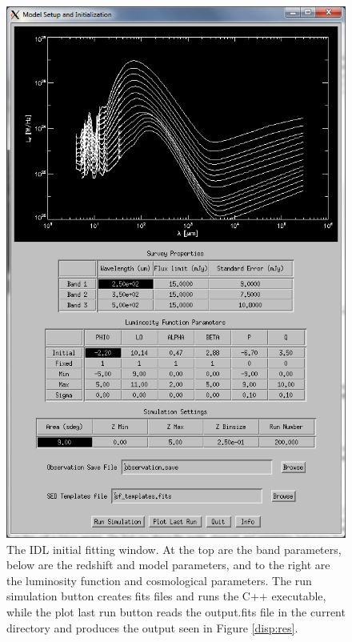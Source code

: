 \documentclass[twocolumn,letterpaper,10pt]{article}
\begin{document}
\begin{figure}
  \centering
  \includegraphics[width=5 in]{initial.png}
  \caption{The IDL initial fitting window. At the top are the band parameters, below are the redshift and model parameters, and to the right are the luminosity function and cosmological parameters. The run simulation button creates fits files and runs the C++ executable, while the plot last run button reads the output.fits file in the current directory and produces the output seen in Figure \ref{disp:res}.}
  \label{disp:init}
\end{figure}
\end{document}
